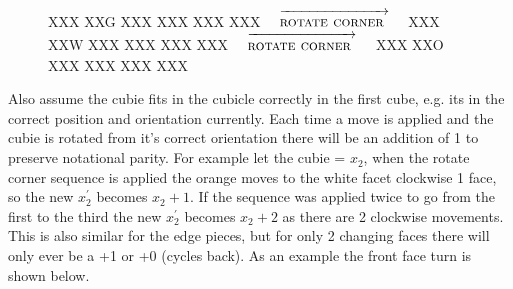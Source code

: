 \documentclass{article}
\begin{document}
\newcommand{\rotatecorner}{[rotatecorner],F2,F2}%
\newcommand{\rotatecornerarr}{$\quad\overrightarrow{\strut\textsc{rotate corner }}\quad$}
\begin{figure}[hbt]
\centering
  \RubikCubeSolved%
   {X}{X}{X} {X}{X}{G}%
   {X}{X}{X} {X}{X}{X}%
   {X}{X}{X} {X}{X}{X}%
  \rotatecornerarr
  \RubikRotation{\rotatecorner}
   {X}{X}{X} {X}{X}{W}%
   {X}{X}{X} {X}{X}{X}%
   {X}{X}{X} {X}{X}{X}%
  \rotatecornerarr
   {X}{X}{X} {X}{X}{O}%
   {X}{X}{X} {X}{X}{X}%
   {X}{X}{X} {X}{X}{X}%
\end{figure}
\vspace{20pt}
Also assume the cubie fits in the cubicle correctly in the first cube, e.g. its in the correct position and orientation currently. Each time a move is applied and the cubie is rotated from it's correct orientation there will be an addition of 1 to preserve notational parity. For example let the cubie = $x_2$, when the rotate corner sequence is applied the orange moves to the white facet clockwise 1 face, so the new $x_2^{'}$ becomes $x_2 + 1$. If the sequence was applied twice to go from the first to the third the new $x_2^{'}$ becomes $x_2 + 2$ as there are 2 clockwise movements. This is also similar for the edge pieces, but for only 2 changing faces there will only ever be a +1 or +0 (cycles back).
As an example the front face turn is shown below.


\end{document}
